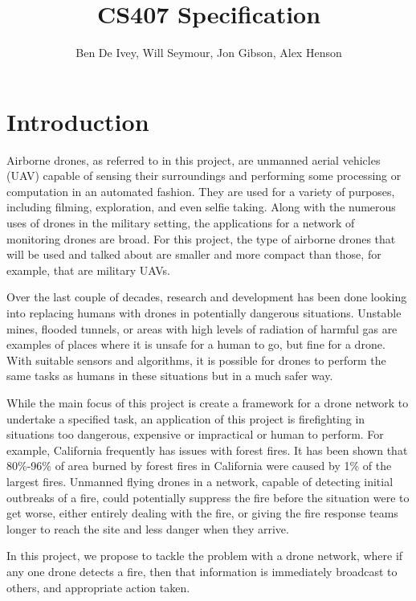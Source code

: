 \documentclass[10pt,a4paper]{article}
\title{CS407 Specification}
\author{Ben De Ivey, Will Seymour, Jon Gibson, Alex Henson}
\begin{document}
    \maketitle
	\section{Introduction}
	
	Airborne drones, as referred to in this project, are unmanned aerial vehicles (UAV) capable of sensing their surroundings and performing some processing or computation in an automated fashion. They are used for a variety of purposes, including filming\cite{skyvantage}, exploration\cite{gemsystems}, and even selfie taking\cite{lily}. Along with the numerous uses of drones in the military setting\cite{sharkey2011automation}, the applications for a network of monitoring drones are broad. For this project, the type of airborne drones that will be used and talked about are smaller and more compact than those, for example, that are military UAVs.
	
    Over the last couple of decades, research and development has been done looking into replacing humans with drones in potentially dangerous situations\cite{kumar2004robot}\cite{ruangpayoongsak2005mobile}. Unstable mines, flooded tunnels, or areas with high levels of radiation of harmful gas are examples of places where it is unsafe for a human to go, but fine for a drone. With suitable sensors and algorithms, it is possible for drones to perform the same tasks as humans in these situations but in a much safer way.
	
    While the main focus of this project is create a framework for a drone network to undertake a specified task, an application of this project is firefighting in situations too dangerous, expensive or impractical or human to perform. For example, California frequently has issues with forest fires. It has been shown that 80\%-96\% of area burned by forest fires in California were caused by 1\% of the largest fires\cite{pyne1982fire}. Unmanned flying drones in a network, capable of detecting initial outbreaks of a fire, could potentially suppress the fire before the situation were to get worse, either entirely dealing with the fire, or giving the fire response teams longer to reach the site and less danger when they arrive.
	
    In this project, we propose to tackle the problem with a drone network, where if any one drone detects a fire, then that information is immediately broadcast to others, and appropriate action taken.
	
\end{document}
